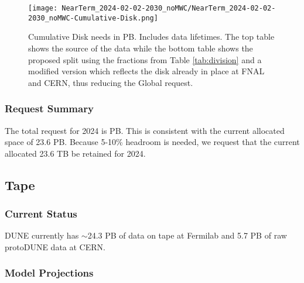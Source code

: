 \documentclass[12pt]{article}
\begin{document}
\begin{figure}[h]
\centering\texttt{[image: NearTerm\_2024-02-02-2030\_noMWC/NearTerm\_2024-02-02-2030\_noMWC-Cumulative-Disk.png]}
\caption{Cumulative Disk needs in PB. Includes data lifetimes.  The top table shows the source of the data while the bottom table  shows the proposed split using the fractions from Table \ref{tab:division} and a modified version which reflects the disk already in place at FNAL and CERN, thus reducing the Global request. }\label{fig:Cumulative-Disk}
\end{figure}





\subsubsection{Request Summary}\label{sec:diskresult}
The total request for 2024 is \DISKTotal PB.  This is consistent with the current allocated space of 23.6 PB. Because 5-10\% headroom is needed, we request that the current allocated  23.6 TB be retained for 2024. 

\clearpage
\subsection{Tape}

\subsubsection{Current Status}

DUNE currently has $\sim$24.3 PB of data\cite{fnaltape} on tape at Fermilab and 5.7 PB of raw protoDUNE data  at CERN\cite{scotgrid}. 

\subsubsection{Model Projections}
\end{document}
